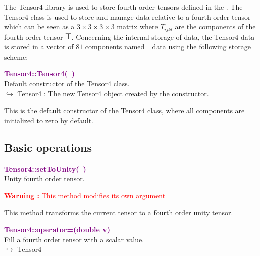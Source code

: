The Tensor4 library is used to store fourth order tensors defined in the \DynELA.
The Tensor4 class is used to store and manage data relative to a fourth order tensor which can be seen as a $3\times3\times3\times3$ matrix where $T_{ijkl}$ are the components of the fourth order tensor $\mbox{\large\ensuremath{\mathsf{T}}}$.
Concerning the internal storage of data, the Tensor4 data is stored in a vector of $81$ components named \textsf{\_data} using the following storage scheme:



\textcolor{purple}{\textbf{Tensor4::Tensor4(~)}}\label{Tensor4::Tensor4()}\\
Default constructor of the Tensor4 class.\\ \hspace*{10mm}$\hookrightarrow$ Tensor4 : The new Tensor4 object created by the constructor.

This is the default constructor of the Tensor4 class, where all components are initialized to zero by default.

\subsection{Basic operations}

\textcolor{purple}{\textbf{Tensor4::setToUnity(~)}}\label{Tensor4::setToUnity()}\\
Unity fourth order tensor.

\hspace*{10mm}\textcolor{red}{\textbf{Warning :} This method modifies its own argument}

This method transforms the current tensor to a fourth order unity tensor.

\textcolor{purple}{\textbf{Tensor4::operator=(double v)}}\label{Tensor4::operator=(double v)}\\
Fill a fourth order tensor with a scalar value.\\ \hspace*{10mm}$\hookrightarrow$ Tensor4

